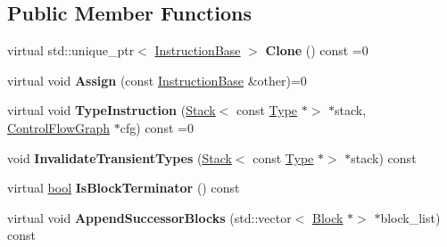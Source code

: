 \subsection*{Public Member Functions}
\begin{DoxyCompactItemize}
\item 
\mbox{\label{structv8_1_1internal_1_1torque_1_1InstructionBase_aa1997d3403c831bd20e91c0edf73934a}} 
virtual std\+::unique\+\_\+ptr$<$ \mbox{\hyperlink{structv8_1_1internal_1_1torque_1_1InstructionBase}{Instruction\+Base}} $>$ {\bfseries Clone} () const =0
\item 
\mbox{\label{structv8_1_1internal_1_1torque_1_1InstructionBase_a3010c9939d943237e01eb5d09594c545}} 
virtual void {\bfseries Assign} (const \mbox{\hyperlink{structv8_1_1internal_1_1torque_1_1InstructionBase}{Instruction\+Base}} \&other)=0
\item 
\mbox{\label{structv8_1_1internal_1_1torque_1_1InstructionBase_a72bcdfceb1ee04eb6365263e588cc02e}} 
virtual void {\bfseries Type\+Instruction} (\mbox{\hyperlink{classv8_1_1internal_1_1torque_1_1Stack}{Stack}}$<$ const \mbox{\hyperlink{classv8_1_1internal_1_1torque_1_1Type}{Type}} $\ast$$>$ $\ast$stack, \mbox{\hyperlink{classv8_1_1internal_1_1torque_1_1ControlFlowGraph}{Control\+Flow\+Graph}} $\ast$cfg) const =0
\item 
\mbox{\label{structv8_1_1internal_1_1torque_1_1InstructionBase_a4280ece607764a5500861cc19524eefb}} 
void {\bfseries Invalidate\+Transient\+Types} (\mbox{\hyperlink{classv8_1_1internal_1_1torque_1_1Stack}{Stack}}$<$ const \mbox{\hyperlink{classv8_1_1internal_1_1torque_1_1Type}{Type}} $\ast$$>$ $\ast$stack) const
\item 
\mbox{\label{structv8_1_1internal_1_1torque_1_1InstructionBase_ab12c26e7e474815af35f1dc3182fa056}} 
virtual \mbox{\hyperlink{classbool}{bool}} {\bfseries Is\+Block\+Terminator} () const
\item 
\mbox{\label{structv8_1_1internal_1_1torque_1_1InstructionBase_af9f65fd49d05a246bb714035946ee9ae}} 
virtual void {\bfseries Append\+Successor\+Blocks} (std\+::vector$<$ \mbox{\hyperlink{classv8_1_1internal_1_1torque_1_1Block}{Block}} $\ast$$>$ $\ast$block\+\_\+list) const
\end{DoxyCompactItemize}
